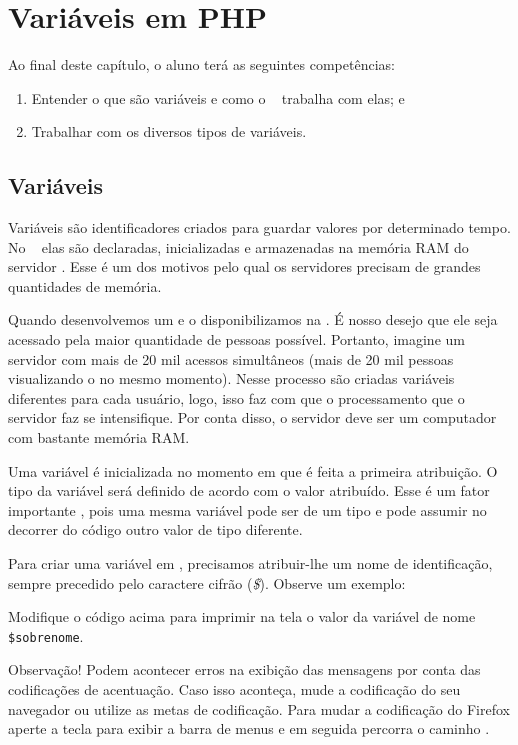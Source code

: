 \chapter{Variáveis em PHP}

Ao final deste capítulo, o aluno terá as seguintes competências:
\begin{enumerate}
    \item Entender o que são variáveis e como o \php~ trabalha com elas; e
    \item Trabalhar com os diversos tipos de variáveis.
\end{enumerate}

\section{Variáveis}
\label{variaveis}

Variáveis são identificadores criados para guardar valores por determinado tempo. 
No \php~ elas são declaradas, inicializadas e armazenadas na memória RAM do servidor \web. 
Esse é um dos motivos pelo qual os servidores precisam de grandes quantidades de memória.

Quando desenvolvemos um \site e o disponibilizamos na \internet. É nosso desejo que ele seja
acessado pela maior quantidade de pessoas possível. Portanto, imagine um servidor com mais 
de 20 mil acessos simultâneos (mais de 20 mil pessoas visualizando o \site no mesmo momento).
Nesse processo são criadas variáveis diferentes para cada usuário, logo, isso faz com que o 
processamento que o servidor faz se intensifique. Por conta disso, o servidor deve ser um 
computador com bastante memória RAM.

Uma variável é inicializada no momento em que é feita a primeira atribuição. O tipo da
variável será definido de acordo com o valor atribuído. Esse é um fator importante \php, 
pois uma mesma variável pode ser de um tipo e pode assumir no decorrer do código outro 
valor de tipo diferente.

Para criar uma variável em \php, precisamos atribuir-lhe um nome de identificação, 
sempre precedido pelo caractere cifrão (\textit{\$}). Observe um exemplo:



Modifique o código acima para imprimir na tela o valor da variável de 
nome \texttt{\$sobrenome}.

Observação! Podem acontecer erros na exibição das mensagens por conta 
das codificações de acentuação. Caso isso aconteça, mude a codificação 
do seu navegador ou utilize as metas de codificação. Para mudar a codificação
do Firefox aperte a tecla \keys{\Alt} para exibir a barra de menus e em seguida
percorra o caminho .

